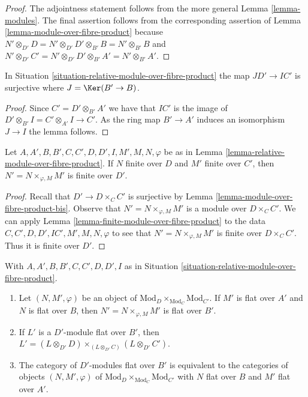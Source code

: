 \begin{proof}
The adjointness statement follows from the more general
Lemma \ref{lemma-modules}.
The final assertion follows from the corresponding assertion of
Lemma \ref{lemma-module-over-fibre-product}
because
$N' \otimes_{D'} D = N' \otimes_{D'} D' \otimes_{B'} B = N' \otimes_{B'} B$
and
$N' \otimes_{D'} C' = N' \otimes_{D'} D' \otimes_{B'} A' = N' \otimes_{B'} A'$.
\end{proof}

\begin{lemma}
\label{lemma-relative-surjection-ideals}
In Situation \ref{situation-relative-module-over-fibre-product}
the map $JD' \to IC'$ is surjective where $J = \Ker(B' \to B)$.
\end{lemma}

\begin{proof}
Since $C' = D' \otimes_{B'} A'$ we have that $IC'$ is the image
of $D' \otimes_{B'} I = C' \otimes_{A'} I \to C'$. As the ring
map $B' \to A'$ induces an isomorphism $J \to I$ the lemma follows.
\end{proof}

\begin{lemma}
\label{lemma-relative-finite-module-over-fibre-product}
Let $A, A', B, B', C, C', D, D', I, M', M, N, \varphi$ be as in
Lemma \ref{lemma-relative-module-over-fibre-product}.
If $N$ finite over $D$ and $M'$ finite over $C'$, then
$N' = N \times_{\varphi, M} M'$ is finite over $D'$.
\end{lemma}

\begin{proof}
Recall that $D' \to D \times_C C'$ is surjective by
Lemma \ref{lemma-module-over-fibre-product-bis}.
Observe that $N' = N \times_{\varphi, M} M'$ is a module
over $D \times_C C'$. We can apply
Lemma \ref{lemma-finite-module-over-fibre-product}
to the data $C, C', D, D', IC', M', M, N, \varphi$
to see that $N' = N \times_{\varphi, M} M'$ is finite
over $D \times_C C'$. Thus it is finite over $D'$.
\end{proof}

\begin{lemma}
\label{lemma-relative-flat-module-over-fibre-product}
With $A, A', B, B', C, C', D, D', I$ as in
Situation \ref{situation-relative-module-over-fibre-product}.
\begin{enumerate}
\item Let $(N, M', \varphi)$ be an object of
$\text{Mod}_D \times_{\text{Mod}_C} \text{Mod}_{C'}$.
If $M'$ is flat over $A'$ and $N$ is flat over $B$, then
$N' = N \times_{\varphi, M} M'$ is flat over $B'$.
\item If $L'$ is a $D'$-module flat over $B'$, then
$L' = (L \otimes_{D'} D) \times_{(L \otimes_{D'} C)} (L \otimes_{D'} C')$.
\item The category of $D'$-modules flat over $B'$
is equivalent to the categories of objects $(N, M', \varphi)$
of $\text{Mod}_D \times_{\text{Mod}_C} \text{Mod}_{C'}$
with $N$ flat over $B$ and $M'$ flat over $A'$.
\end{enumerate}
\end{lemma}

